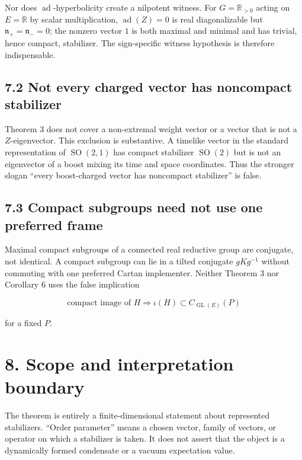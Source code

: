\documentclass[
  10pt,
  letterpaper,
  oneside]{scrartcl}
\begin{document}
Nor does \(\operatorname{ad}\)-hyperbolicity create a nilpotent witness.
For \(G=\mathbb R_{>0}\) acting on \(E=\mathbb R\) by scalar
multiplication, \(\operatorname{ad}(Z)=0\) is real diagonalizable but
\(\mathfrak n_+=\mathfrak n_-=0\); the nonzero vector \(1\) is both
maximal and minimal and has trivial, hence compact, stabilizer. The
sign-specific witness hypothesis is therefore indispensable.

\subsection{7.2 Not every charged vector has noncompact
stabilizer}\label{not-every-charged-vector-has-noncompact-stabilizer}

Theorem 3 does not cover a non-extremal weight vector or a vector that
is not a \(Z\)-eigenvector. This exclusion is substantive. A timelike
vector in the standard representation of \(\operatorname{SO}(2,1)\) has
compact stabilizer \(\operatorname{SO}(2)\) but is not an eigenvector of
a boost mixing its time and space coordinates. Thus the stronger slogan
``every boost-charged vector has noncompact stabilizer'' is false.

\subsection{7.3 Compact subgroups need not use one preferred
frame}\label{compact-subgroups-need-not-use-one-preferred-frame}

Maximal compact subgroups of a connected real reductive group are
conjugate, not identical. A compact subgroup can lie in a tilted
conjugate \(gKg^{-1}\) without commuting with one preferred Cartan
implementer. Neither Theorem 3 nor Corollary 6 uses the false
implication

\[
\text{compact image of }H
\Longrightarrow
\iota(H)\subset C_{\operatorname{GL}(E)}(P)
\]

for a fixed \(P\).

\section{8. Scope and interpretation
boundary}\label{scope-and-interpretation-boundary}

The theorem is entirely a finite-dimensional statement about represented
stabilizers. ``Order parameter'' means a chosen vector, family of
vectors, or operator on which a stabilizer is taken. It does not assert
that the object is a dynamically formed condensate or a vacuum
expectation value.
\end{document}
